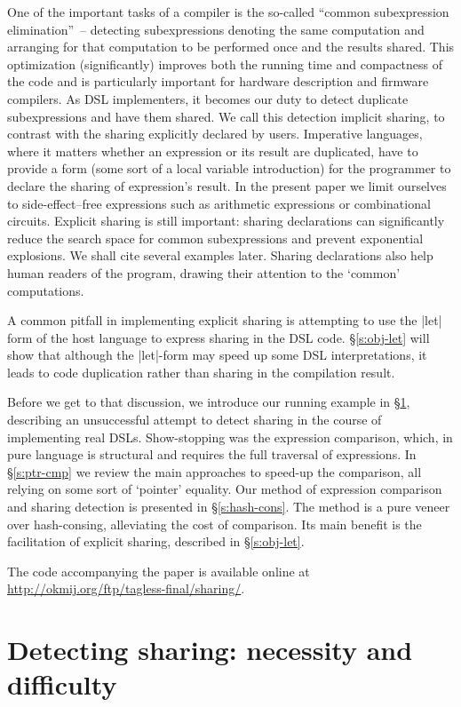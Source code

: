 \documentclass[submission,copyright,creativecommons]{eptcs}
\begin{document}
One of the important tasks of a compiler is the so-called ``common
subexpression elimination''~-- detecting subexpressions denoting the
same computation and arranging for that computation to be performed
once and the results shared. This optimization (significantly)
improves both the running time and compactness of the code and is
particularly important for hardware description and firmware
compilers. As DSL implementers, it becomes our duty to detect
duplicate subexpressions and have them shared. We call this detection
implicit sharing, to contrast with the sharing explicitly declared by
users. Imperative languages, where it matters whether an expression
or its result are duplicated, have to provide a form (some sort of a
local variable introduction) for the programmer to declare the sharing
of expression's result. In the present paper we limit ourselves to
side-effect--free expressions such as arithmetic expressions or
combinational circuits. Explicit sharing is still important: sharing
declarations can significantly reduce the search space for common
subexpressions and prevent exponential explosions. We shall cite
several examples later. Sharing declarations also help human
readers of the program, drawing their attention to the
`common' computations.

A common pitfall in implementing explicit sharing is attempting to use
the |let| form of the host language to express sharing
in the DSL code. \S\ref{s:obj-let} will show that although the |let|-form
may speed up some DSL interpretations, it leads to code
duplication rather than sharing in the compilation result.

Before we get to that discussion, we introduce our running example in
\S\ref{s:cse-problem}, describing an unsuccessful attempt to detect
sharing in the course of implementing real DSLs. Show-stopping was the
expression comparison, which, in pure language is structural and
requires the full traversal of expressions. In \S\ref{s:ptr-cmp} we
review the main approaches to speed-up the comparison, all relying on
some sort of `pointer' equality. Our method of expression comparison
and sharing detection is presented in \S\ref{s:hash-cons}.  The method
is a pure veneer over hash-consing, alleviating the cost of
comparison. Its main benefit is the facilitation of explicit sharing,
described in \S\ref{s:obj-let}.

The code accompanying the paper is available online at
\url{http://okmij.org/ftp/tagless-final/sharing/}.


\section{Detecting sharing: necessity and difficulty}
\label{s:cse-problem}
\end{document}
